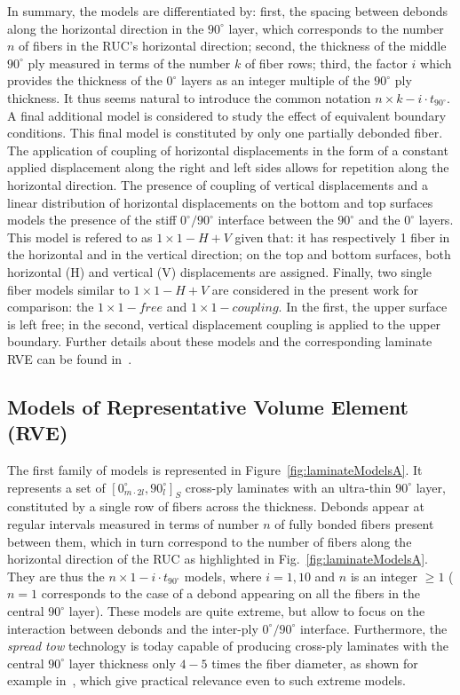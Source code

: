\documentclass[review]{elsarticle}
\begin{document}
In summary, the models are differentiated by: first, the spacing between debonds along the horizontal direction in the $90^{\circ}$ layer, which corresponds to the number $n$ of fibers in the RUC's horizontal direction; second, the thickness of the middle $90^{\circ}$ ply measured in terms of the number $k$ of fiber rows; third, the factor $i$ which provides the thickness of the $0^{\circ}$ layers as an integer multiple of the $90^{\circ}$ ply thickness.  It thus seems natural to introduce the common notation $n\times k-i\cdot t_{90^{\circ}}$. A final additional model is considered to study the effect of equivalent boundary conditions. This final model is constituted by only one partially debonded fiber. The application of coupling of horizontal displacements in the form of a constant applied displacement along the right and left sides allows for repetition along the horizontal direction. The presence of coupling of vertical displacements and a linear distribution of horizontal displacements on the bottom and top surfaces models the presence of the stiff $0^{\circ}/90^{\circ}$ interface between the $90^{\circ}$ and the $0^{\circ}$ layers. This model is refered to as $1\times 1-H+V$ given that: it has respectively 1 fiber in the horizontal and in the vertical direction; on the top and bottom surfaces, both horizontal (H) and vertical (V) displacements are assigned. Finally, two single fiber models similar to  $1\times 1-H+V$ are considered in the present work for comparison: the  $1\times 1-free$ and  $1\times 1-coupling$. In the first, the upper surface is left free; in the second, vertical displacement coupling is applied to the upper boundary. Further details about these models and the corresponding laminate RVE can be found in~\cite{DiStasio2019}.


\subsection{Models of Representative Volume Element (RVE)}\label{subsec:rve}

The first family of models is represented in Figure~\ref{fig:laminateModelsA}. It represents a set of $\left[0_{m\cdot2l}^{\circ},90_{l}^{\circ}\right]_{S}$ cross-ply laminates with an ultra-thin $90^{\circ}$ layer, constituted by a single row of fibers across the thickness. Debonds appear at regular intervals measured in terms of number $n$ of fully bonded fibers present between them, which in turn correspond to the number of fibers along the horizontal direction of the RUC as highlighted in Fig.~\ref{fig:laminateModelsA}. They are thus the $n\times1-i\cdot t_{90^{\circ}}$ models, where $i=1,10$ and $n$ is an integer $\geq1$ ($n=1$ corresponds to the case of a debond appearing on all the fibers in the central $90^{\circ}$ layer). These models are quite extreme, but allow to focus on the interaction between debonds and the inter-ply $0^{\circ}/90^{\circ}$ interface. Furthermore, the \emph{spread tow} technology is today capable of producing cross-ply laminates with the central $90^{\circ}$ layer thickness only $4-5$ times the fiber diameter, as shown for example in~\cite{Saito2012}, which give practical relevance even to such extreme models.
\end{document}
